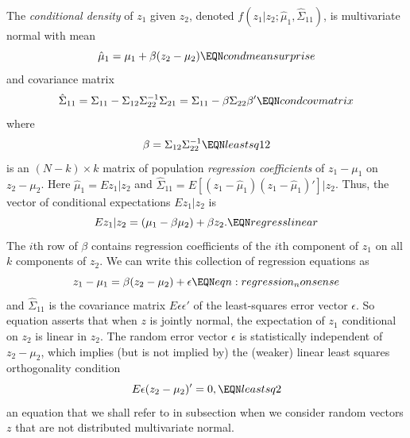 The {\it conditional density\/} of $z_1$ given $z_2$, denoted $f(z_1 | z_2; \hat \mu_1, \hat \Sigma_{11})$, is multivariate normal with mean
$$ \hat \mu_1 = \mu_1 + \beta ( z_2 - \mu_2)  \EQN condmeansurprise $$
and covariance matrix
$$ \hat \Sigma_{11}  = \Sigma_{11} - \Sigma_{12} \Sigma_{22}^{-1} \Sigma_{21} = \Sigma_{11} - \beta \Sigma_{22} \beta' \EQN condcovmatrix $$
where
$$\beta = \Sigma_{12} \Sigma_{22}^{-1} \EQN leastsq12 $$ is an $(N- k) \times k$ matrix
 of population {\it regression coefficients \/} of $z_1 -\mu_1$ on $z_2- \mu_2$.  Here
 $\hat \mu_1 = E z_1 | z_2$ and $\hat \Sigma_{11} = E [ (z_1 - \hat \mu_1) (z_1 - \hat \mu_1)' ]| z_2 $.
Thus, the vector of conditional expectations $E z_1 |z_2$ is
$$ E z_1 | z_2 = (\mu_1 - \beta \mu_2) +  \beta z_2 . \EQN regresslinear $$
 The $i$th row of $\beta$ contains regression coefficients of the $i$th component
of $z_1$ on all $k$ components of $z_2$.
   We can write this collection of  regression equations as
$$ z_1 - \mu_1 = \beta (z_2 - \mu_2) + \epsilon \EQN eqn:regression_nonsense $$
and
$\hat \Sigma_{11}$ is the covariance matrix $E \epsilon \epsilon'$  of the least-squares error vector $\epsilon$.
 So equation  asserts that
when $z$ is jointly normal, the  expectation of $z_1$ conditional on $z_2$ is linear in $z_2$.
The random error vector   $\epsilon$ is statistically independent of $z_2- \mu_2$, which  implies (but is not implied by)
 the (weaker)  linear least squares orthogonality
condition
$$ E \epsilon (z_2 - \mu_2)' = 0 ,  \EQN leastsq2  $$
an equation that we shall refer to in subsection  when we consider random vectors $z$ that are not distributed  multivariate normal.





